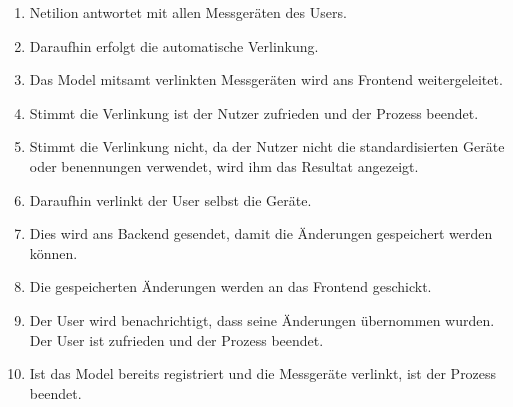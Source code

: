\begin{enumerate}
  \item Netilion antwortet mit allen Messgeräten des Users.
  \item Daraufhin erfolgt die automatische Verlinkung.
  \item Das Model mitsamt verlinkten Messgeräten wird ans Frontend weitergeleitet.
  \item Stimmt die Verlinkung ist der Nutzer zufrieden und der Prozess beendet.
  \item Stimmt die Verlinkung nicht, da der Nutzer nicht die standardisierten Geräte oder benennungen verwendet, wird ihm das Resultat angezeigt.
  \item Daraufhin verlinkt der User selbst die Geräte.
  \item Dies wird ans Backend gesendet, damit die Änderungen gespeichert werden können.
  \item Die gespeicherten Änderungen werden an das Frontend geschickt.
  \item Der User wird benachrichtigt, dass seine Änderungen übernommen wurden. Der User ist zufrieden und der Prozess beendet.
  \item Ist das Model bereits registriert und die Messgeräte verlinkt, ist der Prozess beendet.
\end{enumerate}
